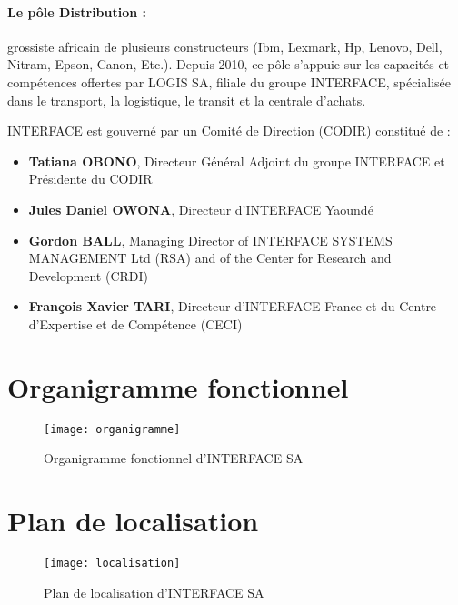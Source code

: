 \paragraph{Le pôle Distribution :} grossiste africain de plusieurs constructeurs (Ibm, Lexmark, Hp, Lenovo, Dell, Nitram, Epson, Canon, Etc.). Depuis 2010, ce pôle s’appuie sur les capacités et compétences offertes par LOGIS SA, filiale du groupe INTERFACE, spécialisée dans le transport, la logistique, le transit  et la centrale d’achats.

INTERFACE est gouverné par un Comité de Direction (CODIR) constitué de :
\begin{itemize}
    \item \textbf{Tatiana OBONO}, Directeur Général Adjoint du groupe INTERFACE et Présidente du CODIR
    \item \textbf{Jules Daniel OWONA}, Directeur d’INTERFACE Yaoundé
    \item \textbf{Gordon BALL}, Managing Director of INTERFACE SYSTEMS MANAGEMENT Ltd (RSA) and of the Center for Research and Development (CRDI)
    \item \textbf{François Xavier TARI}, Directeur d’INTERFACE France et du Centre d’Expertise et de Compétence (CECI)  
    
\end{itemize}




\section{Organigramme fonctionnel}
\begin{figure}[H]
    \centering
    \texttt{[image: organigramme]}
    \caption{Organigramme fonctionnel d'INTERFACE SA}
    \label{fig:organigramme}
\end{figure}

\section{Plan de localisation}
\begin{figure}[H]
    \centering
    \texttt{[image: localisation]}
    \caption{Plan de localisation d'INTERFACE SA}
    \label{fig:localisation}
\end{figure}

